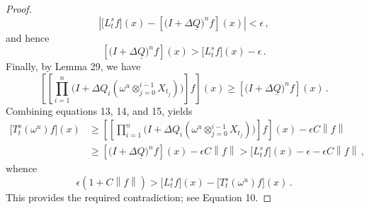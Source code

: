 \documentclass[a4paper,reqno]{amsart}
\newcommand{\lrate}{\underline{Q}}
\newcommand{\norm}[1]{\left\lVert #1 \right\rVert}
\begin{document}
\begin{proof}
\begin{equation*}
\left\vert \bigl[L_t^sf\bigr](x) - \left[\bigl(I + \Delta\lrate\bigr)^n f\right](x)\right\vert < \epsilon\,,
\end{equation*}
and hence
\begin{equation}
\left[\bigl(I + \Delta\lrate\bigr)^n f\right](x) > \bigl[L_t^sf\bigr](x) - \epsilon\,.
\end{equation}
Finally, by Lemma 29, we have
\begin{equation}
\left[\left[\prod_{i=1}^n\bigl(I + \Delta Q_i(\omega^u\otimes_{j=0}^{i-1}X_{t_j})\bigr) \right]f\right](x) \geq \left[\bigl(I + \Delta\lrate\bigr)^n f\right](x)\,.
\end{equation}
Combining equations 13, 14, and 15, yields
\begin{align*}
\bigl[T_t^s(\omega^u)f\bigr](x) &\geq \left[\left[\prod_{i=1}^n\bigl(I + \Delta Q_i(\omega^u\otimes_{j=0}^{i-1}X_{t_j})\bigr) \right]f\right](x) - \epsilon C\norm{f} \\
 &\geq \left[\bigl(I + \Delta\lrate\bigr)^n f\right](x) - \epsilon C\norm{f} > \bigl[L_t^sf\bigr](x) - \epsilon - \epsilon C\norm{f}\,,
\end{align*}
whence
\begin{equation*}
\epsilon(1+C\norm{f})> \bigl[L_t^sf\bigr](x) - \bigl[T_t^s(\omega^u)f\bigr](x)\,.
\end{equation*}
This provides the required contradiction; see Equation 10.
\end{proof}

 
%
\end{document}
